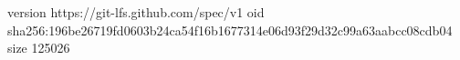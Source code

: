 version https://git-lfs.github.com/spec/v1
oid sha256:196be26719fd0603b24ca54f16b1677314e06d93f29d32c99a63aabcc08cdb04
size 125026

